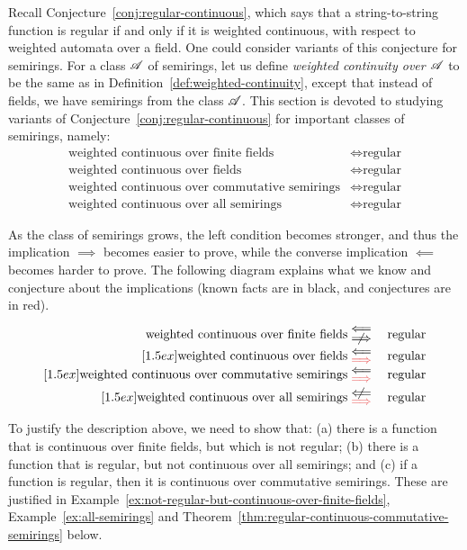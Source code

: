   Recall Conjecture~\ref{conj:regular-continuous}, which says that a string-to-string function is regular if and only if it is weighted continuous, with respect to weighted automata over a field. One could consider variants of this conjecture for semirings.  For a class $\mathscr A$ of semirings, let us define \emph{weighted continuity over $\mathscr A$} to be the same as in Definition~\ref{def:weighted-continuity}, except that instead of fields, we have semirings from the class $\mathscr A$. This section is devoted to studying   variants of Conjecture~\ref{conj:regular-continuous} for  important classes of semirings, namely:
\begin{align}
\text{weighted continuous over finite fields}
& \iff
\text{regular}
\label{eq:weighted-continuous-finite-fields}\\
\text{weighted continuous over fields}
& \iff
\text{regular}
\label{eq:weighted-continuous-fields}\\
    \text{weighted continuous over commutative semirings}
& \iff
\text{regular}
\label{eq:weighted-continuous-commutative-semirings}\\
\text{weighted continuous over all semirings}
& \iff
\text{regular}
\label{eq:weighted-continuous-all-semirings}
\end{align}

As the class of semirings grows, the left condition becomes stronger, and thus the implication $\implies$ becomes easier to prove, while the converse implication $\impliedby$ becomes harder to prove. The following diagram explains what we know and conjecture about the implications (known facts are in black, and conjectures are in red).

\begin{eqnarray*}
\text{weighted continuous over finite fields}
& \raisebox{-3pt}{\stackon[1pt]{\(\centernot\implies\)}{\(\impliedby\)}}
& \text{regular}\\ [1.5ex]
\text{weighted continuous over fields}
& \raisebox{-3pt}{\stackon[3pt]{\(\red\implies\)}{\(\impliedby\)}}
&  \text{regular}\\ [1.5ex]
    \text{weighted continuous over commutative semirings}
& \raisebox{-3pt}{\stackon[3pt]{\(\red\implies\)}{\(\impliedby\)}}
& \text{regular}\\ [1.5ex]
\text{weighted continuous over all semirings}
& \raisebox{-3pt}{\stackon[1pt]{\(\red\implies\)}{\({\centernot \impliedby}\)}}
& \text{regular}
\end{eqnarray*}

To justify the description above, we need to show that: (a) there is a function that is continuous over finite fields, but which is not regular; (b) there is a function that is regular, but not continuous over all semirings; and (c) if a function is regular, then it is continuous over commutative semirings. These are justified in Example~\ref{ex:not-regular-but-continuous-over-finite-fields}, Example~\ref{ex:all-semirings} and Theorem~\ref{thm:regular-continuous-commutative-semirings} below.


